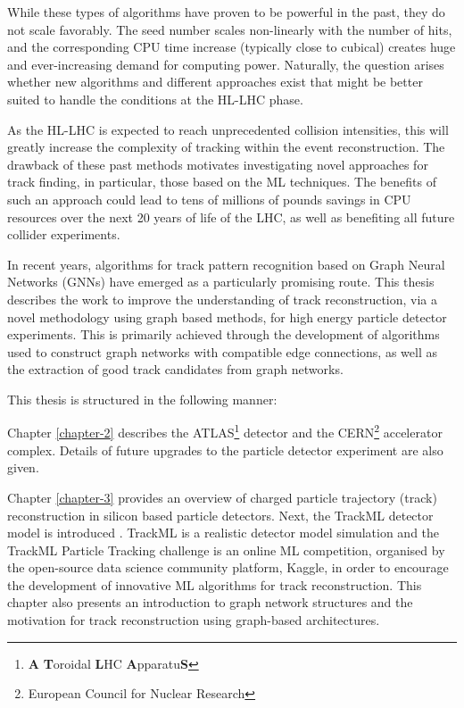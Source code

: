 While these types of algorithms have proven to be powerful in the past, they do not scale favorably. The seed number scales non-linearly with the number of hits, and the corresponding CPU time increase (typically close to cubical) creates huge and ever-increasing demand for computing power. Naturally, the question arises whether new algorithms and different approaches exist that might be better suited to handle the conditions at the \ac{HL-LHC} phase.

As the \ac{HL-LHC} is expected to reach unprecedented collision intensities, this will greatly increase the complexity of tracking within the event reconstruction. The drawback of these past methods motivates investigating novel approaches for track finding, in particular, those based on the \ac{ML} techniques. The benefits of such an approach could lead to tens of millions of pounds savings in CPU resources over the next 20 years of life of the \ac{LHC}, as well as benefiting all future collider experiments.

In recent years, algorithms for track pattern recognition based on Graph Neural Networks (GNNs) have emerged as a particularly promising route. This thesis describes the work to improve the understanding of track reconstruction, via a novel methodology using graph based methods, for high energy particle detector experiments. This is primarily achieved through the development of algorithms used to construct graph networks with compatible edge connections, as well as the extraction of good track candidates from graph networks. 

This thesis is structured in the following manner:

Chapter \ref{chapter-2} describes the ATLAS\footnote[1]{\textbf{A} \textbf{T}oroidal \textbf{L}HC \textbf{A}pparatu\textbf{S}} detector and the CERN\footnote[2]{European Council for Nuclear Research} accelerator complex. Details of future upgrades to the particle detector experiment are also given.

Chapter \ref{chapter-3} provides an overview of charged particle trajectory (track) reconstruction in silicon based particle detectors. Next, the TrackML detector model is introduced \cite{kaggle-trackml}. TrackML is a realistic detector model simulation and the TrackML Particle Tracking challenge is an online \ac{ML} competition, organised by the open-source data science community platform, Kaggle, in order to encourage the development of innovative \ac{ML} algorithms for track reconstruction. This chapter also presents an introduction to graph network structures and the motivation for track reconstruction using graph-based architectures.

